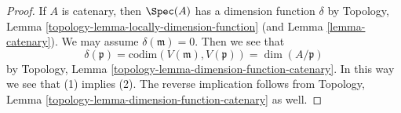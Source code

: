 \begin{proof}
If $A$ is catenary, then $\Spec(A)$ has a dimension function $\delta$ by
Topology, Lemma \ref{topology-lemma-locally-dimension-function}
(and Lemma \ref{lemma-catenary}). We may assume $\delta(\mathfrak m) = 0$.
Then we see that
$$
\delta(\mathfrak p) = \text{codim}(V(\mathfrak m), V(\mathfrak p)) =
\dim(A/\mathfrak p)
$$
by Topology, Lemma \ref{topology-lemma-dimension-function-catenary}.
In this way we see that (1) implies (2). The reverse implication
follows from
Topology, Lemma \ref{topology-lemma-dimension-function-catenary}
as well.
\end{proof}














